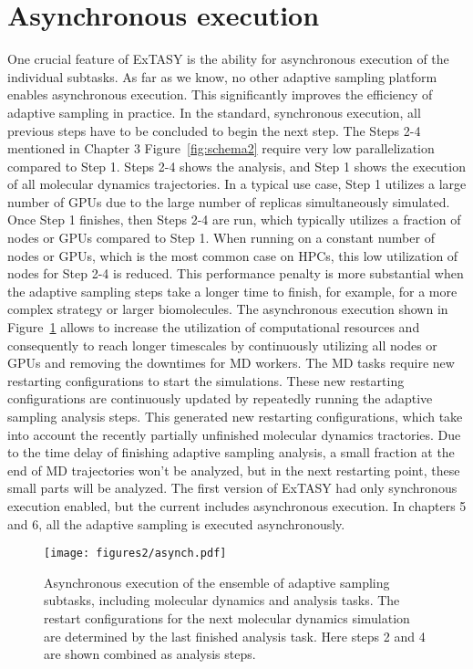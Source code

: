 {\section{\label{sec:asynch}Asynchronous execution}

One crucial feature of ExTASY is the ability for asynchronous execution of the individual subtasks. As far as we know, no other adaptive sampling platform enables asynchronous execution. This significantly improves the efficiency of adaptive sampling in practice. In the standard, synchronous execution, all previous steps have to be concluded to begin the next step. 
The Steps 2-4 mentioned in Chapter 3 Figure~\ref{fig:schema2} require very low parallelization compared to Step 1. Steps 2-4 shows the analysis, and Step 1 shows the execution of all molecular dynamics trajectories. In a typical use case, Step 1 utilizes a large number of GPUs due to the large number of replicas simultaneously simulated. Once Step 1 finishes, then Steps 2-4 are run, which typically utilizes a fraction of nodes or GPUs compared to Step 1. When running on a constant number of nodes or GPUs, which is the most common case on HPCs, this low utilization of nodes for Step 2-4 is reduced. This performance penalty is more substantial when the adaptive sampling steps take a longer time to finish, for example, for a more complex strategy or larger biomolecules. The asynchronous execution shown in Figure~\ref{fig:asynch} allows to increase the utilization of computational resources and consequently to reach longer timescales by continuously utilizing all nodes or GPUs and removing the downtimes for MD workers. The MD tasks require new restarting configurations to start the simulations. These new restarting configurations are continuously updated by repeatedly running the adaptive sampling analysis steps. This generated new restarting configurations, which take into account the recently partially unfinished molecular dynamics tractories. Due to the time delay of finishing adaptive sampling analysis, a small fraction at the end of MD trajectories won't be analyzed, but in the next restarting point, these small parts will be analyzed.
The first version of ExTASY\cite{Extasy2016} had only synchronous execution enabled, but the current \cite{Extasy2019} includes asynchronous execution. In chapters 5 and 6, all the adaptive sampling is executed asynchronously. 

\begin{figure}[h]
  \centering
  \texttt{[image: figures2/asynch.pdf]}
  \caption{Asynchronous execution of the ensemble of adaptive sampling subtasks, including molecular dynamics and analysis tasks. The restart configurations for the next molecular dynamics simulation are determined by the last finished analysis task. Here steps 2 and 4 are shown combined as analysis steps.}
  \label{fig:asynch}
\end{figure}



}
